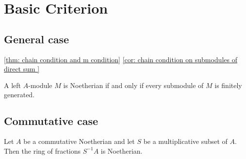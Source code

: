 \section{Basic Criterion}
\subsection{General case}
\cref{thm: chain condition and m condition} \cref{cor: chain condition on submodules of direct sum }

\begin{proposition}
    A left $A$-module $M$ is Noetherian if and only if every submodule of $M$ is finitely generated.
\end{proposition}


\subsection{Commutative case}


\begin{proposition}
    Let $A$ be a commutative Noetherian and let $S$ be a multiplicative subset of $A$.
    Then the ring of fractions $S^{-1} A$ is Noetherian.
\end{proposition}







